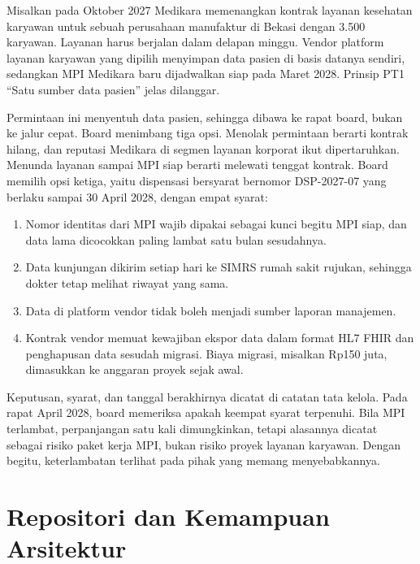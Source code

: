 \begin{kasus}[title={Kasus Medikara Health: Pengecualian dari Prinsip Satu Sumber Data Pasien}]
Misalkan pada Oktober 2027 Medikara memenangkan kontrak layanan kesehatan
karyawan untuk sebuah perusahaan manufaktur di Bekasi dengan 3.500
karyawan. Layanan harus berjalan dalam delapan minggu. Vendor platform
layanan karyawan yang dipilih menyimpan data pasien di basis datanya
sendiri, sedangkan MPI Medikara baru dijadwalkan siap pada Maret 2028.
Prinsip PT1 ``Satu sumber data pasien'' jelas dilanggar.

Permintaan ini menyentuh data pasien, sehingga dibawa ke rapat board, bukan
ke jalur cepat. Board menimbang tiga opsi. Menolak permintaan berarti
kontrak hilang, dan reputasi Medikara di segmen layanan korporat ikut
dipertaruhkan. Menunda layanan sampai MPI siap berarti melewati tenggat
kontrak. Board memilih opsi ketiga, yaitu dispensasi bersyarat bernomor
DSP-2027-07 yang berlaku sampai 30 April 2028, dengan empat syarat:

\begin{enumerate}
  \item Nomor identitas dari MPI wajib dipakai sebagai kunci begitu MPI
        siap, dan data lama dicocokkan paling lambat satu bulan sesudahnya.
  \item Data kunjungan dikirim setiap hari ke SIMRS rumah sakit rujukan,
        sehingga dokter tetap melihat riwayat yang sama.
  \item Data di platform vendor tidak boleh menjadi sumber laporan
        manajemen.
  \item Kontrak vendor memuat kewajiban ekspor data dalam format HL7 FHIR
        dan penghapusan data sesudah migrasi. Biaya migrasi, misalkan Rp150
        juta, dimasukkan ke anggaran proyek sejak awal.
\end{enumerate}

Keputusan, syarat, dan tanggal berakhirnya dicatat di catatan tata kelola.
Pada rapat April 2028, board memeriksa apakah keempat syarat terpenuhi. Bila
MPI terlambat, perpanjangan satu kali dimungkinkan, tetapi alasannya dicatat
sebagai risiko paket kerja MPI, bukan risiko proyek layanan karyawan. Dengan
begitu, keterlambatan terlihat pada pihak yang memang menyebabkannya.
\end{kasus}

\section{Repositori dan Kemampuan Arsitektur}

